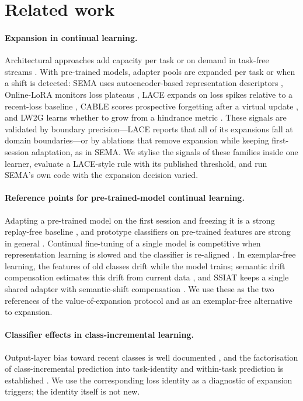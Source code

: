 \documentclass[10pt]{article}
\begin{document}
\section{Related work}

\paragraph{Expansion in continual learning.} Architectural approaches add capacity per task \citep{rusu2016pnn,yoon2018den} or on demand in task-free streams \citep{lee2020cndpm,ye2023sedem}. With pre-trained models, adapter pools are expanded per task \citep{zhou2024ease} or when a shift is detected: SEMA uses autoencoder-based representation descriptors \citep{wang2025sema}, Online-LoRA monitors loss plateaus \citep{wei2025onlinelora}, LACE expands on loss spikes relative to a recent-loss baseline \citep{tathe2026lace}, CABLE scores prospective forgetting after a virtual update \citep{julian2025cable}, and LW2G learns whether to grow from a hindrance metric \citep{feng2024lw2g}. These signals are validated by boundary precision---LACE reports that all of its expansions fall at domain boundaries---or by ablations that remove expansion while keeping first-session adaptation, as in SEMA. We stylise the signals of these families inside one learner, evaluate a LACE-style rule with its published threshold, and run SEMA's own code with the expansion decision varied.

\paragraph{Reference points for pre-trained-model continual learning.} Adapting a pre-trained model on the first session and freezing it is a strong replay-free baseline \citep{panos2023fsa,zhou2024aper}, and prototype classifiers on pre-trained features are strong in general \citep{rebuffi2017icarl,mai2021scr,mcdonnell2023ranpac}. Continual fine-tuning of a single model is competitive when representation learning is slowed and the classifier is re-aligned \citep{zhang2023slca}. In exemplar-free learning, the features of old classes drift while the model trains; semantic drift compensation estimates this drift from current data \citep{yu2020sdc,gomezvilla2024ldc}, and SSIAT keeps a single shared adapter with semantic-shift compensation \citep{tan2024ssiat}. We use these as the two references of the value-of-expansion protocol and as an exemplar-free alternative to expansion.

\paragraph{Classifier effects in class-incremental learning.} Output-layer bias toward recent classes is well documented \citep{wu2019bic,hou2019lucir,caccia2022ace}, and the factorisation of class-incremental prediction into task-identity and within-task prediction is established \citep{kim2022theoretical}. We use the corresponding loss identity as a diagnostic of expansion triggers; the identity itself is not new.
\end{document}
